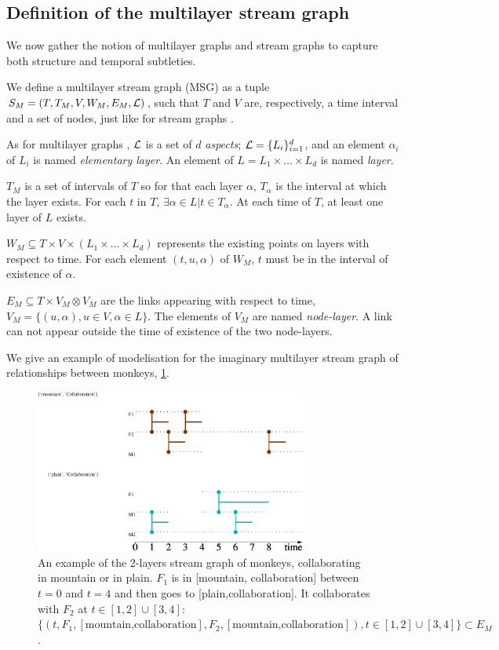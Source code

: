 \documentclass{svproc}
\begin{document}
\subsection{Definition of the multilayer stream graph}
%
We now gather the notion of multilayer graphs and stream graphs to capture both structure and temporal subtleties.

We define a multilayer stream graph (MSG) as a tuple $S_M = (T,T_M,V,W_M,E_M,{\cal L})$, such that $T$ and $V$ are, respectively, a time interval and a set of nodes, just like for stream graphs \cite{stream}.
    
    As for multilayer graphs \cite{mlkiv}, ${\cal L}$ is a set of $d$ {\em aspects}; ${\cal L} = \{L_i\}_{i=1}^d$, and an element $\alpha_i$ of $L_i$ is named {\em elementary layer}. An element of $L=L_1\times \dots \times L_d$ is named {\em layer}.

	$T_M$ is a set of intervals of $T$ so for that each layer $\alpha$, $T_{\alpha}$ is the interval at which the layer exists. For each $t$ in $T$, $\exists \alpha \in L | t \in T_{\alpha}$. At each time of $T$, at least one layer of $L$ exists.

	$W_M \subseteq T\times V \times (L_1 \times \dots \times L_d)$ represents the existing points on layers with respect to time. For each element $(t,u,\alpha)$ of $W_M$, $t$ must be in the interval of existence of $\alpha$.

   $E_M \subseteq T\times V_M \otimes V_M$ are the links appearing with respect to time,  $V_M = \{ (u,\alpha), u\in V, \alpha \in L\}$. The elements of $V_M$ are named {\em node-layer}. A link can not appear outside the time of existence of the two node-layers.
   
   We give an example of modelisation for the imaginary multilayer stream graph of relationships between monkeys, \cref{multistreamMonkeys}.
   \begin{figure}[h]
   	\includegraphics[width=0.8\textwidth]{img/monkeymls.pdf}
   	\caption{An example of the 2-layers stream graph of monkeys, collaborating in mountain or in plain. $F_1$ is in [mountain, collaboration] between $t=0$ and $t=4$ and then goes to [plain,collaboration]. It collaborates with $F_2$ at $t\in [1,2]\cup[3,4]$: $\{(t,F_1,[\text{mountain,collaboration}],F_2,[\text{mountain,collaboration}]),t\in [1,2]\cup[3,4]\} \subset E_M$.}
   	\label{multistreamMonkeys}
   \end{figure}
   
\end{document}
